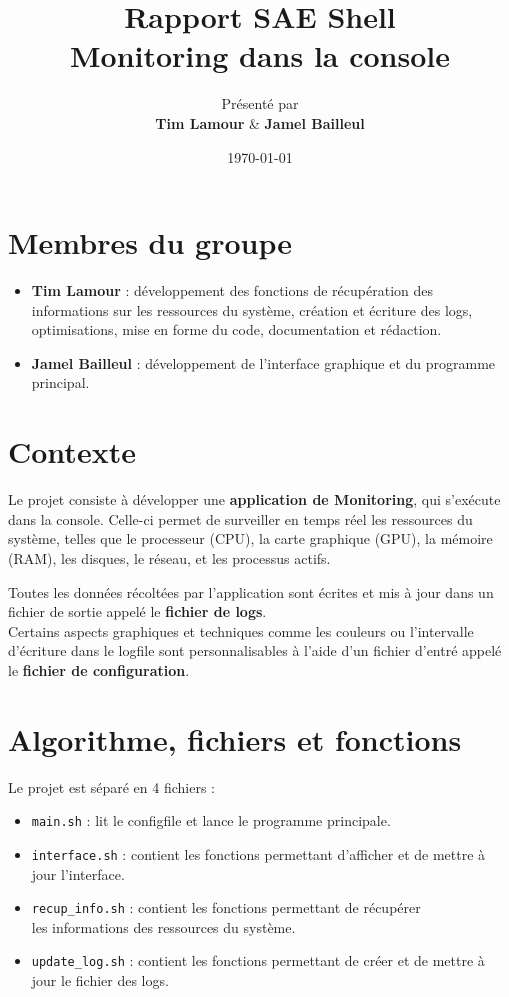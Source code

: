 \documentclass{article}
\title{\Huge \textbf{Rapport SAE Shell} \\[0.5cm] \Large Monitoring dans la console}
\author{\large Présenté par\\ \textbf{Tim Lamour} \& \textbf{Jamel Bailleul}}
\date{\today}
\begin{document}
\maketitle %
\tableofcontents %
\newpage

\section{Membres du groupe}
\begin{itemize}
    \item \textbf{Tim Lamour} : développement des fonctions de récupération des informations sur les ressources du système, création et écriture des logs, optimisations, mise en forme du code, documentation et rédaction.
    \item \textbf{Jamel Bailleul} : développement de l'interface graphique et du programme principal.

\end{itemize}

\section{Contexte}
Le projet consiste à développer une \textbf{application de Monitoring}, qui s'exécute dans la console.
Celle-ci permet de surveiller en temps réel les ressources du système, telles que le processeur (CPU), la carte graphique (GPU), la mémoire (RAM), les disques, le réseau, et les processus actifs.
\vspace{1em}

Toutes les données récoltées par l'application sont écrites et mis à jour dans un fichier de sortie appelé le \textbf{fichier de logs}.
\\
Certains aspects graphiques et techniques comme les couleurs ou l'intervalle d'écriture dans le logfile sont personnalisables à l'aide d'un fichier d'entré appelé le \textbf{fichier de configuration}.

\section{Algorithme, fichiers et fonctions}
Le projet est séparé en 4 fichiers :
\begin{itemize}
    \item \texttt{main.sh} : lit le configfile et lance le programme principale.
    \item \texttt{interface.sh} : contient les fonctions permettant d'afficher et de mettre à jour l'interface.
    \item \texttt{recup\_info.sh} : contient les fonctions permettant de récupérer\\ les informations des ressources du système.
    \item \texttt{update\_log.sh} : contient les fonctions permettant de créer et de mettre à jour le fichier des logs. 
\end{itemize}
\vspace{1em}
\end{document}
